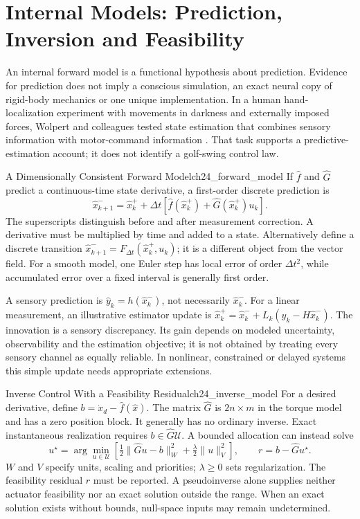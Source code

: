\section{Internal Models: Prediction, Inversion and Feasibility}
\label{sec:ch24_internal_models}
An internal forward model is a functional hypothesis about prediction. Evidence for prediction does not imply a conscious simulation, an exact neural copy of rigid-body mechanics or one unique implementation. In a human hand-localization experiment with movements in darkness and externally imposed forces, Wolpert and colleagues tested state estimation that combines sensory information with motor-command information \citep{Wolpert1995Integration}. That task supports a predictive-estimation account; it does not identify a golf-swing control law.

\begin{definition}{A Dimensionally Consistent Forward Model}{ch24_forward_model}
If $\hat f$ and $\hat G$ predict a continuous-time state derivative, a first-order discrete prediction is
\[
\hat x_{k+1}^{-}=\hat x_k^{+}
+\Delta t\left[\hat f(\hat x_k^{+})+\hat G(\hat x_k^{+})u_k\right].
\]
The superscripts distinguish before and after measurement correction. A derivative must be multiplied by time and added to a state. Alternatively define a discrete transition $\hat x_{k+1}^{-}=F_{\Delta t}(\hat x_k^{+},u_k)$; it is a different object from the vector field. For a smooth model, one Euler step has local error of order $\Delta t^2$, while accumulated error over a fixed interval is generally first order.
\end{definition}

A sensory prediction is $\hat y_k=h(\hat x_k^-)$, not necessarily $\hat x_k^-$. For a linear measurement, an illustrative estimator update is $\hat x_k^+=\hat x_k^-+L_k(y_k-H\hat x_k^-)$. The innovation is a sensory discrepancy. Its gain depends on modeled uncertainty, observability and the estimation objective; it is not obtained by treating every sensory channel as equally reliable. In nonlinear, constrained or delayed systems this simple update needs appropriate extensions.

\begin{definition}{Inverse Control With a Feasibility Residual}{ch24_inverse_model}
For a desired derivative, define $b=\dot x_d-\hat f(\hat x)$. The matrix $\hat G$ is $2n\times m$ in the torque model and has a zero position block. It generally has no ordinary inverse. Exact instantaneous realization requires $b\in\hat G\mathcal U$. A bounded allocation can instead solve
\[
u^\star=\arg\min_{u\in\mathcal U}
\left[\tfrac12\lVert\hat G u-b\rVert_W^2+
\tfrac\lambda2\lVert u\rVert_V^2\right],\qquad
r=b-\hat G u^\star.
\]
$W$ and $V$ specify units, scaling and priorities; $\lambda\geq0$ sets regularization. The feasibility residual $r$ must be reported. A pseudoinverse alone supplies neither actuator feasibility nor an exact solution outside the range. When an exact solution exists without bounds, null-space inputs may remain undetermined.
\end{definition}

